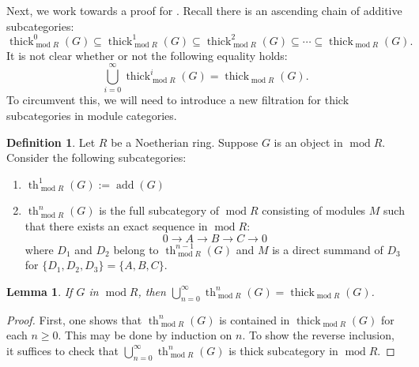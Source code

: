 \documentclass[11pt]{amsart}
\newcounter{intro}
\theoremstyle{plain}
\newtheorem{lemma}[theorem]{Lemma}
\theoremstyle{definition}
\newtheorem{definition}[theorem]{Definition}
\numberwithin{equation}{section}
\numberwithin{theorem}{section}
\begin{document}
Next, we work towards a proof for . Recall there is an ascending chain of additive subcategories:
\begin{displaymath}
    \operatorname{thick}_{\operatorname{mod}R}^0 (G) \subseteq \operatorname{thick}_{\operatorname{mod}R}^1 (G) \subseteq \operatorname{thick}_{\operatorname{mod}R}^2(G) \subseteq \cdots \subseteq \operatorname{thick}_{\operatorname{mod}R}(G).
\end{displaymath}
It is not clear whether or not the following equality holds:
\begin{displaymath}
    \bigcup^\infty_{i=0} \operatorname{thick}_{\operatorname{mod}R}^i (G) = \operatorname{thick}_{\operatorname{mod}R} (G).
\end{displaymath}
To circumvent this, we will need to introduce a new filtration for thick subcategories in module categories.

\begin{definition}
    Let $R$ be a Noetherian ring. Suppose $G$ is an object in $ \operatorname{mod}R$. Consider the following subcategories:
    \begin{enumerate}
        \item $\operatorname{th}_{\operatorname{mod}R}^1 (G):=\operatorname{add} (G)$ 
        \item $\operatorname{th}_{\operatorname{mod}R}^n (G)$ is the full subcategory of $\operatorname{mod} R$ consisting of modules $M$ such that there exists an exact sequence in $\operatorname{mod}R$:
        \begin{displaymath}
            0 \to A \to B \to C \to 0
        \end{displaymath} 
        where $D_1$ and $D_2$ belong to $\operatorname{th}_{\operatorname{mod}R}^{n-1} (G)$ and $M$ is a direct summand of $D_3$ for $\{D_1,D_2,D_3\}=\{A,B,C\}$.
    \end{enumerate}
\end{definition}

\begin{lemma}\label{lem:large_thickenings_filtration}
    If $G$ in $ \operatorname{mod}R$, then $\bigcup_{n=0}^\infty \operatorname{th}_{\operatorname{mod}R}^n (G) = \operatorname{thick}_{\operatorname{mod}R} (G)$.
\end{lemma}

\begin{proof}
    First, one shows that $\operatorname{th}_{\operatorname{mod}R}^n (G) $ is contained in $ \operatorname{thick}_{\operatorname{mod}R} (G)$ for each $n\geq 0$. This may be done by induction on $n$. To show the reverse inclusion, it suffices to check that $\bigcup_{n=0}^\infty \operatorname{th}_{\operatorname{mod}R}^n (G)$ is thick subcategory in $\operatorname{mod}R$.
\end{proof}
\end{document}
